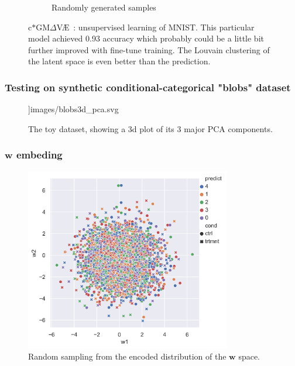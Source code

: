 \documentclass[final]{beamer}
\theoremstyle{plain}
\theoremstyle{definition}
\theoremstyle{remark}
\newcommand{\w}{\mathbf{w}}
\newcommand{\gmvae}{c$\ast$GM$\Delta$V\AE~}
\begin{document}
\begin{frame}
\begin{figure}[h]
\begin{subfigure}[b]{0.3\textwidth}
\caption{Randomly generated samples}
\label{fig:mnist_us_samples}
\end{subfigure}
\caption{\gmvae: unsupervised learning of MNIST. This particular model
achieved 0.93 accuracy which probably could be a little bit further
improved with fine-tune training. The Louvain clustering of the latent space is even better
than the prediction.}
\label{fig:mnist_us_10}
\end{figure}

\end{frame}

\begin{frame}
\frametitle{Testing on synthetic conditional-categorical "blobs" dataset}
\begin{figure}[h]
\centering
\textwidth]{images/blobs3d_pca.svg}
\caption{The toy dataset, showing a 3d plot of its 3 major PCA components.
}
\label{fig:blobs_3d}
\end{figure}
\end{frame}


\begin{frame}
\frametitle{$\w$ embeding}
\begin{figure}[h]
\centering
\includegraphics[width=0.8\textwidth]{images/blobs_cgmvae_learnedprior_w.png}
\caption{Random sampling from the encoded distribution of the $\w$ space. 
}
\label{fig:blobs_lp_w}
\end{figure}
\end{frame}
\end{document}
